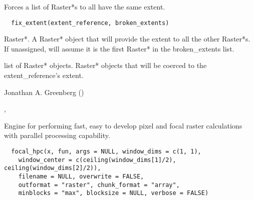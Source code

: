 \documentclass[a4paper]{book}
\begin{document}
%
\begin{Description}\relax
Forces a list of Raster*s to all have the same extent.
\end{Description}
%
\begin{Usage}
\begin{verbatim}
  fix_extent(extent_reference, broken_extents)
\end{verbatim}
\end{Usage}
%
\begin{Arguments}
\begin{ldescription}
\item[\code{extent\_reference}] Raster*. A Raster* object that
will provide the extent to all the other Raster*s.  If
unassigned, will assume it is the first Raster* in the
broken\_extents list.

\item[\code{broken\_extents}] list of Raster* objects. Raster*
objects that will be coerced to the extent\_reference's
extent.
\end{ldescription}
\end{Arguments}
%
\begin{Author}\relax
Jonathan A. Greenberg
()
\end{Author}
%
\begin{SeeAlso}\relax
{},
\end{SeeAlso}
%
\begin{Description}\relax
Engine for performing fast, easy to develop pixel and
focal raster calculations with parallel processing
capability.
\end{Description}
%
\begin{Usage}
\begin{verbatim}
  focal_hpc(x, fun, args = NULL, window_dims = c(1, 1),
    window_center = c(ceiling(window_dims[1]/2), ceiling(window_dims[2]/2)),
    filename = NULL, overwrite = FALSE,
    outformat = "raster", chunk_format = "array",
    minblocks = "max", blocksize = NULL, verbose = FALSE)
\end{verbatim}
\end{Usage}
%
\end{document}
